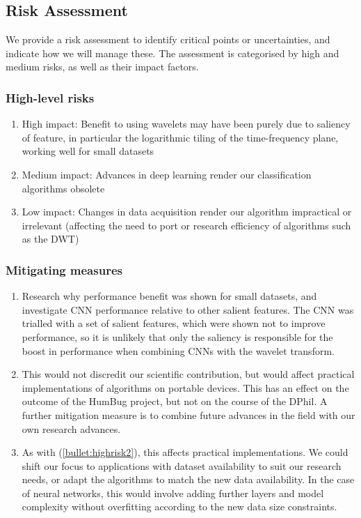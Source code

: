\documentclass[12pt]{llncs}
\begin{document}
\subsection{Risk Assessment}
We provide a risk assessment to identify critical points or uncertainties, and indicate how we will manage these. The assessment is categorised by high and medium risks, as well as their impact factors.

\subsubsection{High-level risks} 
\begin{enumerate} 
\item High impact: Benefit to using wavelets may have been purely due to saliency of feature, in particular the logarithmic tiling of the time-frequency plane, working well for small datasets
\item Medium impact: Advances in deep learning render our classification algorithms obsolete
\label{bullet:highrisk2}
\item Low impact: Changes in data acquisition render our algorithm impractical or irrelevant (affecting the need to port or research efficiency of algorithms such as the DWT)


\end{enumerate}


\subsubsection{Mitigating measures}
\begin{enumerate} 
    \item Research why performance benefit was shown for small datasets, and investigate CNN performance relative to other salient features. The CNN was trialled with a set of salient features, which were shown not to improve performance, so it is unlikely that only the saliency is responsible for the boost in performance when combining CNNs with the wavelet transform.
    \item This would not discredit our scientific contribution, but would affect practical implementations of algorithms on portable devices. This has an effect on the outcome of the HumBug project, but not on the course of the DPhil. A further mitigation measure is to combine future advances in the field with our own research advances.
	\item As with (\ref{bullet:highrisk2}), this affects practical implementations. We could shift our focus to applications with dataset availability to suit our research needs, or adapt the algorithms to match the new data availability. In the case of neural networks, this would involve adding further layers and model complexity without overfitting according to the new data size constraints.

\end{enumerate}
\end{document}
